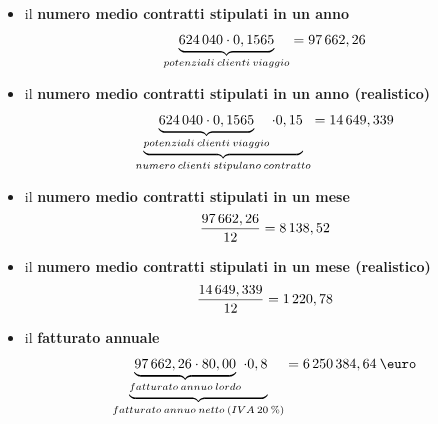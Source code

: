\begin{itemize}
\item il \textbf{numero medio contratti stipulati in un anno}
	\begin{equation}
	\label{eq:num_contratti_teorico_anno}
	\begin{split}
		\underbrace{624\thinspace 040 \cdot 0,1565}_{potenziali \: clienti\: viaggio} = 97\thinspace 662,26
	\end{split}
	\end{equation}

\item il \textbf{numero medio contratti stipulati in un anno (realistico)}
	\begin{equation}
	\label{eq:num_contratti_realistico_anno}
	\begin{split}
		\underbrace{\underbrace{624\thinspace 040 \cdot 0,1565}_{potenziali \: clienti\: viaggio} \cdot 0,15}_{numero \: clienti \: stipulano \: contratto} = 14\thinspace 649,339
	\end{split}
	\end{equation}

\item il \textbf{numero medio contratti stipulati in un mese}
	\begin{equation}
	\label{eq:num_contratti_teorico_mensile}
	\begin{split}
		\frac{97\thinspace 662,26}{12} = 8\thinspace 138,52
	\end{split}
	\end{equation}

\item il \textbf{numero medio contratti stipulati in un mese (realistico)}
	\begin{equation}
	\label{eq:num_contratti_realistico_mensile}
	\begin{split}
		\frac{14\thinspace 649,339}{12} = 1\thinspace 220,78
	\end{split}
	\end{equation}


\item il \textbf{fatturato annuale}
	\begin{equation}
	\label{eq:fatturato_teorico_anno_netto}
	\begin{split}
		\underbrace{\underbrace{97\thinspace 662,26 \cdot 80,00}_{fatturato\: annuo\: lordo} \cdot 0,8}_{fatturato\: annuo\: netto\: (IVA \:20 \: \%)} = 6\thinspace 250\thinspace 384,64 \: \mbox{\euro} 
	\end{split}
	\end{equation}	
	

\end{itemize}
